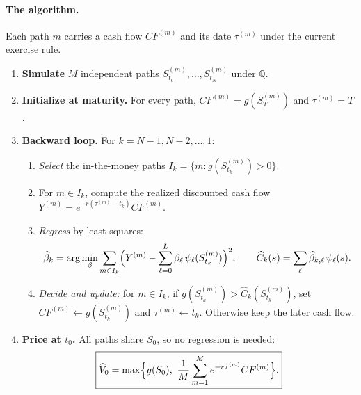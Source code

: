 \documentclass[10pt]{article}
\newcommand{\Q}{\mathbb Q}
\newcommand{\1}{\mathbf 1}
\theoremstyle{definition}
\begin{document}
\paragraph{The algorithm.}
Each path \(m\) carries a cash flow \(CF^{(m)}\) and its date
\(\tau^{(m)}\) under the current exercise rule.
\begin{enumerate}
\item \textbf{Simulate} \(M\) independent paths
      \(S^{(m)}_{t_0},\ldots,S^{(m)}_{t_N}\) under \(\Q\).
\item \textbf{Initialize at maturity.} For every path,
      \(CF^{(m)}=g(S^{(m)}_T)\) and \(\tau^{(m)}=T\).
\item \textbf{Backward loop.} For \(k=N-1,N-2,\ldots,1\):
  \begin{enumerate}
  \item[(a)] \emph{Select} the in-the-money paths
        \(I_k=\{m:g(S^{(m)}_{t_k})>0\}\).
  \item[(b)] For \(m\in I_k\), compute the realized discounted cash flow
        \(Y^{(m)}=e^{-r(\tau^{(m)}-t_k)}CF^{(m)}\).
  \item[(c)] \emph{Regress} by least squares:
        \[
        \widehat\beta_k=\arg\min_\beta\sum_{m\in I_k}
        \Bigl(Y^{(m)}-\sum_{\ell=0}^L\beta_\ell\,\psi_\ell(S^{(m)}_{t_k})\Bigr)^2,
        \qquad
        \widehat C_k(s)=\sum_{\ell}\widehat\beta_{k,\ell}\,\psi_\ell(s).
        \]
  \item[(d)] \emph{Decide and update:} for \(m\in I_k\), if
        \(g(S^{(m)}_{t_k})>\widehat C_k(S^{(m)}_{t_k})\), set
        \(CF^{(m)}\leftarrow g(S^{(m)}_{t_k})\) and
        \(\tau^{(m)}\leftarrow t_k\). Otherwise keep the later cash flow.
  \end{enumerate}
\item \textbf{Price at \(t_0\).} All paths share \(S_0\), so no regression
      is needed:
      \[
      \boxed{\widehat V_0=\max\Bigl\{g(S_0),\ \frac1M\sum_{m=1}^M
      e^{-r\tau^{(m)}}CF^{(m)}\Bigr\}.}
      \]
\end{enumerate}

\end{document}
